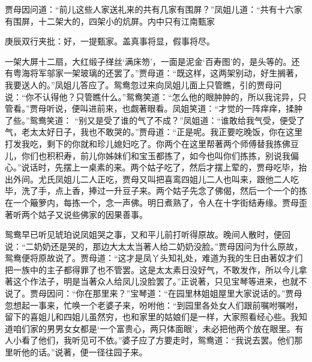 \begin{parag}
    贾母因问道：“前儿这些人家送礼来的共有几家有围屏？”凤姐儿道：“共有十六家有围屏，十二架大的，四架小的炕屏。内中只有江南甄家\begin{note}庚辰双行夹批：好，一提甄家。盖真事将显，假事将尽。\end{note}一架大屏十二扇，大红缎子缂丝‘满床笏’，一面是泥金‘百寿图’的，是头等的。还有粤海将军邬家一架玻璃的还罢了。”贾母道：“既这样，这两架别动，好生搁著，我要送人的。”凤姐儿答应了。鸳鸯忽过来向凤姐儿面上只管瞧，引的贾母问说：“你不认得他？只管瞧什么。”鸳鸯笑道：“怎么他的眼肿肿的，所以我诧异，只管看。”贾母听说，便叫进前来，也觑著眼看。凤姐笑道：“才觉的一阵痒痒，揉肿了些。”鸳鸯笑道： “别又是受了谁的气了不成？”凤姐道：“谁敢给我气受，便受了气，老太太好日子，我也不敢哭的。”贾母道：“正是呢。我正要吃晚饭，你在这里打发我吃，剩下的你就和珍儿媳妇吃了。你两个在这里帮著两个师傅替我拣佛豆儿，你们也积积寿，前儿你姊妹们和宝玉都拣了，如今也叫你们拣拣，别说我偏心。”说话时，先摆上一桌素的来。两个姑子吃了，然后才摆上荤的，贾母吃毕，抬出外间。尤氏凤姐儿二人正吃，贾母又叫把喜鸾四姐儿二人也叫来，跟他二人吃毕，洗了手，点上香，捧过一升豆子来。两个姑子先念了佛偈，然后一个一个的拣在一个簸箩内，每拣一个，念一声佛。明日煮熟了，令人在十字街结寿缘。贾母歪著听两个姑子又说些佛家的因果善事。
\end{parag}


\begin{parag}
    鸳鸯早已听见琥珀说凤姐哭之事，又和平儿前打听得原故。晚间人散时，便回说：“二奶奶还是哭的，那边大太太当著人给二奶奶没脸。”贾母因问为什么原故，鸳鸯便将原故说了。贾母道：“这才是凤丫头知礼处，难道为我的生日由著奴才们把一族中的主子都得罪了也不管罢。这是太太素日没好气，不敢发作，所以今儿拿著这个作法子，明是当著众人给凤儿没脸罢了。”正说著，只见宝琴等进来，也就不说了。贾母因问：“你在那里来？”宝琴道：“在园里林姐姐屋里大家说话的。”贾母忽想起一事来，忙唤一个老婆子来，吩咐他：“到园里各处女人们跟前嘱咐嘱咐，留下的喜姐儿和四姐儿虽然穷，也和家里的姑娘们是一样，大家照看经心些。我知道咱们家的男男女女都是‘一个富贵心，两只体面眼’，未必把他两个放在眼里。有人小看了他们，我听见可不依。”婆子应了方要走时，鸳鸯道：“我说去罢。他们那里听他的话。”说著，便一径往园子来。
\end{parag}



